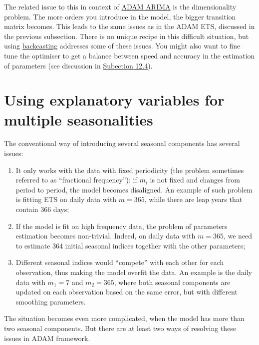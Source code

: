\documentclass[
]{book}
\providecommand{\tightlist}{%
  \setlength{\itemsep}{0pt}\setlength{\parskip}{0pt}}
\theoremstyle{definition}
\theoremstyle{definition}
\theoremstyle{definition}
\theoremstyle{definition}
\theoremstyle{remark}
\begin{document}
The related issue to this in context of \protect\hyperlink{StateSpaceARIMA}{ADAM ARIMA} is the dimensionality problem. The more orders you introduce in the model, the bigger transition matrix becomes. This leads to the same issues as in the ADAM ETS, discussed in the previous subsection. There is no unique recipe in this difficult situation, but using \protect\hyperlink{ADAMInitialisationOptAndBack}{backcasting} addresses some of these issues. You might also want to fine tune the optimiser to get a balance between speed and accuracy in the estimation of parameters (see discussion in \protect\hyperlink{ADAMInitialisationOptAndBack}{Subection 12.4}).

\hypertarget{ETSXMultipleSeasonality}{%
\section{Using explanatory variables for multiple seasonalities}\label{ETSXMultipleSeasonality}}

The conventional way of introducing several seasonal components has several issues:

\begin{enumerate}
\def\labelenumi{\arabic{enumi}.}
\tightlist
\item
  It only works with the data with fixed periodicity (the problem sometimes referred to as ``fractional frequency''): if \(m_i\) is not fixed and changes from period to period, the model becomes disaligned. An example of such problem is fitting ETS on daily data with \(m=365\), while there are leap years that contain 366 days;
\item
  If the model is fit on high frequency data, the problem of parameters estimation becomes non-trivial. Indeed, on daily data with \(m=365\), we need to estimate 364 initial seasonal indices together with the other parameters;
\item
  Different seasonal indices would ``compete'' with each other for each observation, thus making the model overfit the data. An example is the daily data with \(m_1=7\) and \(m_2=365\), where both seasonal components are updated on each observation based on the same error, but with different smoothing parameters.
\end{enumerate}

The situation becomes even more complicated, when the model has more than two seasonal components. But there are at least two ways of resolving these issues in ADAM framework.
\end{document}
